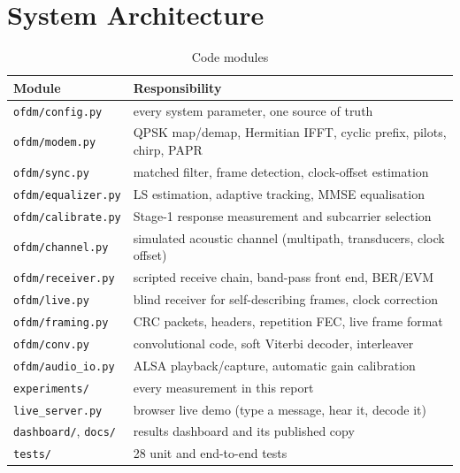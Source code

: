 \documentclass[11pt,a4paper]{report}
\begin{document}
\section{System Architecture}
\label{sec:params}
\begin{table}[htbp]
\centering
\small
\begin{tabular}{|l|l|}
\hline
\textbf{Module} & \textbf{Responsibility} \\
\hline
\texttt{ofdm/config.py} & every system parameter, one source of truth \\
\texttt{ofdm/modem.py} & QPSK map/demap, Hermitian IFFT, cyclic prefix, pilots, chirp, PAPR \\
\texttt{ofdm/sync.py} & matched filter, frame detection, clock-offset estimation \\
\texttt{ofdm/equalizer.py} & LS estimation, adaptive tracking, MMSE equalisation \\
\texttt{ofdm/calibrate.py} & Stage-1 response measurement and subcarrier selection \\
\texttt{ofdm/channel.py} & simulated acoustic channel (multipath, transducers, clock offset) \\
\texttt{ofdm/receiver.py} & scripted receive chain, band-pass front end, BER/EVM \\
\texttt{ofdm/live.py} & blind receiver for self-describing frames, clock correction \\
\texttt{ofdm/framing.py} & CRC packets, headers, repetition FEC, live frame format \\
\texttt{ofdm/conv.py} & convolutional code, soft Viterbi decoder, interleaver \\
\texttt{ofdm/audio\_io.py} & ALSA playback/capture, automatic gain calibration \\
\texttt{experiments/} & every measurement in this report \\
\texttt{live\_server.py} & browser live demo (type a message, hear it, decode it) \\
\texttt{dashboard/}, \texttt{docs/} & results dashboard and its published copy \\
\texttt{tests/} & 28 unit and end-to-end tests \\
\hline
\end{tabular}
\caption{Code modules}
\end{table}
\end{document}
